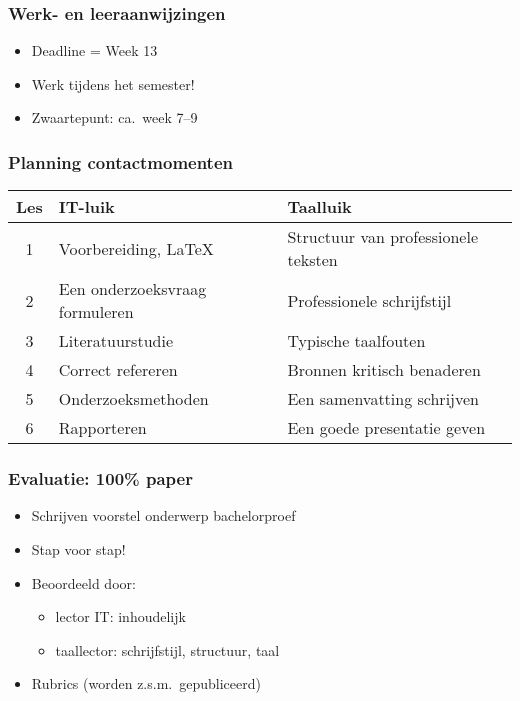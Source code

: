 \documentclass[aspectratio=169]{beamer}
\begin{document}
\begin{frame}
  \frametitle{Werk- en leeraanwijzingen}

  \begin{itemize}
    \item Deadline = Week 13
    \item Werk tijdens het semester!
    \item Zwaartepunt: ca.\ week 7--9
  \end{itemize}

\end{frame}

\begin{frame}
  \frametitle{Planning contactmomenten}

  \begin{table}
    \centering
    \small
    \begin{tabular}{cll}
      \toprule
      \textbf{Les} & \textbf{IT-luik}               & \textbf{Taalluik}                   \\
      \midrule
      1               & Voorbereiding, {\LaTeX}        & Structuur van professionele teksten \\
      2               & Een onderzoeksvraag formuleren & Professionele schrijfstijl          \\
      3               & Literatuurstudie               & Typische taalfouten                 \\
      4               & Correct refereren              & Bronnen kritisch benaderen          \\
      5               & Onderzoeksmethoden             & Een samenvatting schrijven          \\
      6               & Rapporteren                    & Een goede presentatie geven         \\
    \end{tabular}
  \end{table}

\end{frame}

\begin{frame}
  \frametitle{Evaluatie: 100\% paper}

  \begin{itemize}
    \item Schrijven voorstel onderwerp bachelorproef
    \item Stap voor stap!
    \item Beoordeeld door:
      \begin{itemize}
        \item lector IT: inhoudelijk
        \item taallector: schrijfstijl, structuur, taal
      \end{itemize} 
    \item Rubrics (worden z.s.m.\ gepubliceerd)
  \end{itemize}

\end{frame}
\end{document}
